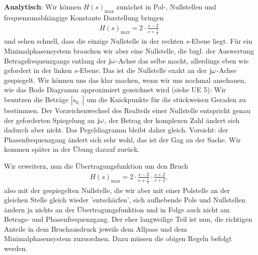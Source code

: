 \begin{ExCalc}
\textbf{Analytisch}:
Wir können $H(s)_\mathrm{max} $ zunächst in Pol-, Nullstellen und frequenzunabhängige
Konstante Darstellung bringen
\begin{align}
H(s)_\mathrm{max} = 2\cdot\frac{s-2}{s+\frac{1}{2}}
\end{align}
und sehen schnell, dass die einzige Nullstelle in der rechten $s$-Ebene liegt.
Für ein Minimalphasensystem brauchen wir aber eine Nullstelle, die bzgl. der Auswertung
Betragsfrequenzgangs entlang der $\im\omega$-Achse das selbe macht, allerdings
eben wie gefordert in der linken $s$-Ebene.
Das ist die Nullstelle exakt an der $\im\omega$-Achse gespiegelt.
Wir können uns das klar machen, wenn wir uns nochmal anschauen, wie das Bode
Diagramm approximiert gezeichnet wird (siehe UE 5):
Wir benutzen die Beträge $|s_{0,\cdot}|$ um die Knickpunkte für
die stückweisen Geraden zu bestimmen.
Der Vorzeichenwechsel des Realteils einer Nullstelle entspricht genau der
geforderten Spiegelung an $\im\omega$, der Betrag der komplexen Zahl ändert
sich dadurch aber nicht. Das Pegeldiagramm bleibt daher gleich. Vorsicht: der
Phasenfrequenzgang ändert sich sehr wohl, das ist der Gag an der Sache. Wir kommen
später in der Übung darauf zurück.

Wir erweitern,
nun die Übertragungsfunktion um den Bruch
\begin{align}
H(s)_\mathrm{max} = 2\cdot\frac{s-2}{s+\frac{1}{2}} \cdot \frac{s+2}{s+2},
\end{align}
also mit der gespiegelten Nullstelle, die wir aber mit einer Polstelle
an der gleichen Stelle gleich wieder 'entschärfen', sich aufhebende Pole und Nullstellen
ändern ja nichts an der Übertragungsfunktion und in Folge auch nicht am Betrags-
und Phasenfrequenzgang.
Der eher langweilige Teil ist nun, die richtigen Anteile in dem Bruchausdruck
jeweils dem Allpass und dem Minimalphasensystem zuzuordnen.
Dazu müssen die obigen Regeln befolgt werden.


\end{ExCalc}
